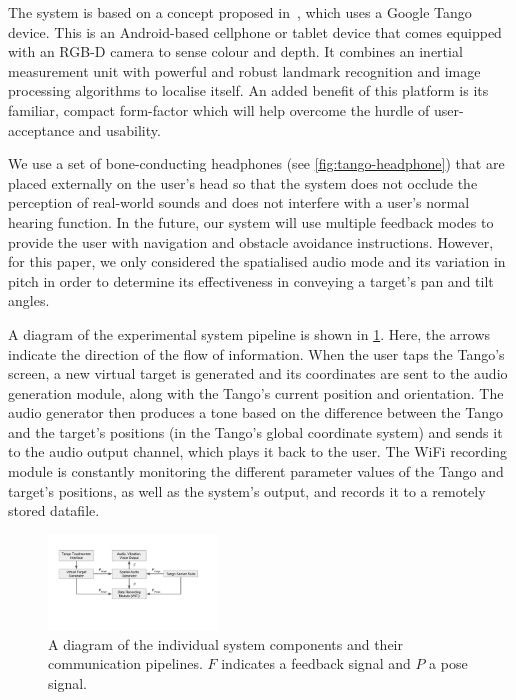 \documentclass[sigconf, review=true, screen=true, anonymous=true]{acmart}
\begin{document}
The system is based on a concept proposed in~\cite{bellotto2013, lock2017portable}, which uses a Google Tango device.
This is an Android-based cellphone or tablet device that comes equipped with an RGB-D camera to sense colour and depth.
It combines an inertial measurement unit with powerful and robust landmark recognition and image processing algorithms to localise itself.
An added benefit of this platform is its familiar, compact form-factor which will help overcome the hurdle of user-acceptance and usability.

We use a set of bone-conducting headphones (see \cref{fig:tango-headphone}) that are placed externally on the user's head so that the system does not occlude the perception of real-world sounds and does not interfere with a user's normal hearing function.
In the future, our system will use multiple feedback modes to provide the user with navigation and obstacle avoidance instructions.
However, for this paper, we only considered the spatialised audio mode and its variation in pitch in order to determine its effectiveness in conveying a target's pan and tilt angles.

A diagram of the experimental system pipeline is shown in \cref{fig:pipeline}.
Here, the arrows indicate the direction of the flow of information.
When the user taps the Tango's screen, a new virtual target is generated and its coordinates are sent to the audio generation module, along with the Tango's current position and orientation.
The audio generator then produces a tone based on the difference between the Tango and the target's positions (in the Tango's global coordinate system) and sends it to the audio output channel, which plays it back to the user.
The WiFi recording module is constantly monitoring the different parameter values of the Tango and target's positions, as well as the system's output, and records it to a remotely stored datafile. 

\begin{figure}
  \centering
  \includegraphics[clip=true, trim=50 120 80 50, width=0.4\textwidth]{figures/pipeline.pdf}
  \caption{A diagram of the individual system components and their communication pipelines. $F$ indicates a feedback signal and $P$ a pose signal. }
\label{fig:pipeline}
\end{figure}
\end{document}
